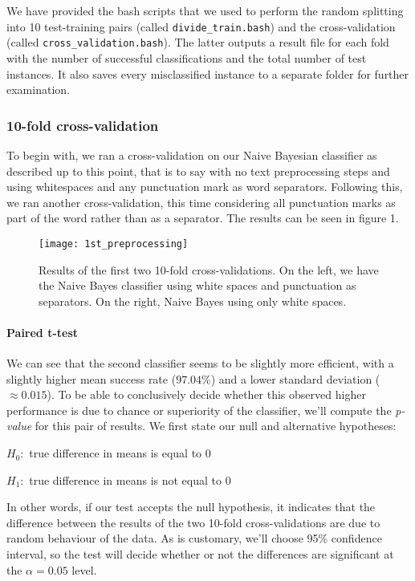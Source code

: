 \documentclass[12pt,a4paper]{report}
\begin{document}
We have provided the bash scripts that we used to perform the random splitting into 10 test-training pairs (called \texttt{divide\_train.bash}) and the cross-validation (called \texttt{cross\_validation.bash}). The latter outputs a result file for each fold with the number of successful classifications and the total number of test instances. It also saves every misclassified instance to a separate folder for further examination.

\subsubsection{10-fold cross-validation}

To begin with, we ran a cross-validation on our Naive Bayesian classifier as described up to this point, that is to say with no text preprocessing steps and using whitespaces and any punctuation mark as word separators. Following this, we ran another cross-validation, this time considering all punctuation marks as part of the word rather than as a separator. The results can be seen in figure 1.

\begin{figure}
\texttt{[image: 1st\_preprocessing]}
\centering
\caption{Results of the first two 10-fold cross-validations. On the left, we have the Naive Bayes classifier using white spaces and punctuation as separators. On the right, Naive Bayes using only white spaces.}
\end{figure}

\paragraph*{Paired t-test}
We can see that the second classifier seems to be slightly more efficient, with a slightly higher mean success rate ($97.04\%$) and a lower standard deviation ($\approx0.015$). To be able to conclusively decide whether this observed higher performance is due to chance or superiority of the classifier, we'll compute the \textit{p-value} for this pair of results. We first state our null and alternative hypotheses:
\begin{center}
$H_0: $ true difference in means is equal to 0

$H_1: $ true difference in means is not equal to 0
\end{center}
In other words, if our test accepts the null hypothesis, it indicates that the difference between the results of the two 10-fold cross-validations are due to random behaviour of the data. As is customary, we'll choose 95\% confidence interval, so the test will decide whether or not the differences are significant at the $\alpha = 0.05$ level.
\end{document}
